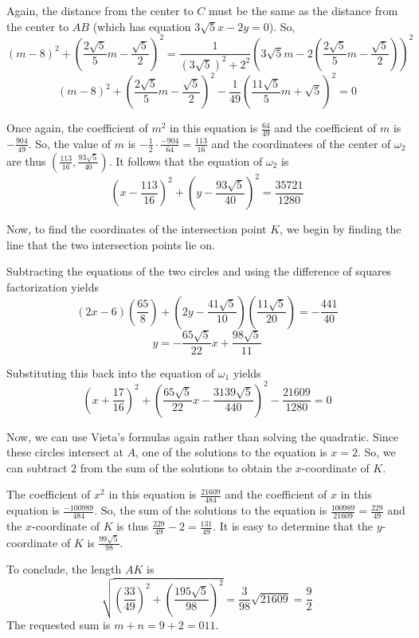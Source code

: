 \begin{enumerate}
 Again, the distance from the center to $C$ must be the same as the distance from the center to $AB$ (which has equation $3\sqrt{5}x-2y=0$). So, 
 \[(m-8)^2+\left(\frac{2\sqrt5}{5} m-\frac{\sqrt 5}{2} \right)^2=\frac{1}{(3\sqrt5)^2+2^2} \left(3\sqrt{5} m-2 \left(\frac{2\sqrt5}{5}m -\frac{\sqrt5}{2} \right) \right)^2\] 
 \[(m-8)^2+\left(\frac{2\sqrt5}{5} m-\frac{\sqrt 5}{2} \right)^2-\frac{1}{49} \left(\frac{11\sqrt5}{5}m+\sqrt 5 \right)^2=0\]

 Once again, the coefficient of $m^2$ in this equation is $\frac{64}{49}$ and the coefficient of $m$ is $-\frac{904}{49}$. So, the value of $m$ is $-\frac{1}{2} \cdot \frac{-904}{64}=\frac{113}{16}$ and the coordinatees of the center of $\omega_2$ are thus $\left(\frac{113}{16}, \frac{93\sqrt5}{40} \right)$. It follows that the equation of $\omega_2$ is 
 \[\left(x-\frac{113}{16} \right)^2+\left(y-\frac{93\sqrt5}{40} \right)^2=\frac{35721}{1280}\]

 Now, to find the coordinates of the intersection point $K$, we begin by finding the line that the two intersection points lie on.

 Subtracting the equations of the two circles and using the difference of squares factorization yields 
 \[(2x-6) \left(\frac{65}{8} \right)+\left(2y-\frac{41\sqrt5}{10} \right) \left(\frac{11\sqrt5}{20} \right)=-\frac{441}{40}\] 
 \[y=-\frac{65\sqrt5}{22}x+\frac{98\sqrt5}{11}\] 

 Substituting this back into the equation of $\omega_1$ yields 
 \[\left(x+\frac{17}{16} \right)^2+\left(\frac{65\sqrt5}{22}x-\frac{3139\sqrt5}{440} \right)^2-\frac{21609}{1280}=0\]

 Now, we can use Vieta's formulas again rather than solving the quadratic. Since these circles intersect at $A$, one of the solutions to the equation is $x=2$. So, we can subtract $2$ from the sum of the solutions to obtain the $x$-coordinate of $K$.

 The coefficient of $x^2$ in this equation is $\frac{21609}{484}$ and the coefficient of $x$ in this equation is $\frac{-100989}{484}$. So, the sum of the solutions to the equation is $\frac{100989}{21609}=\frac{229}{49}$ and the $x$-coordinate of $K$ is thus $\frac{229}{49}-2=\frac{131}{49}$. It is easy to determine that the $y$-coordinate of $K$ is $\frac{99\sqrt5}{98}$.

 To conclude, the length $AK$ is 
 \[\sqrt{\left(\frac{33}{49} \right)^2+\left(\frac{195 \sqrt 5}{98} \right)^2}=\frac{3}{98} \sqrt{21609}=\frac{9}{2}\] The requested sum is $m+n=9+2=\boxed{011}$.


\end{enumerate}
